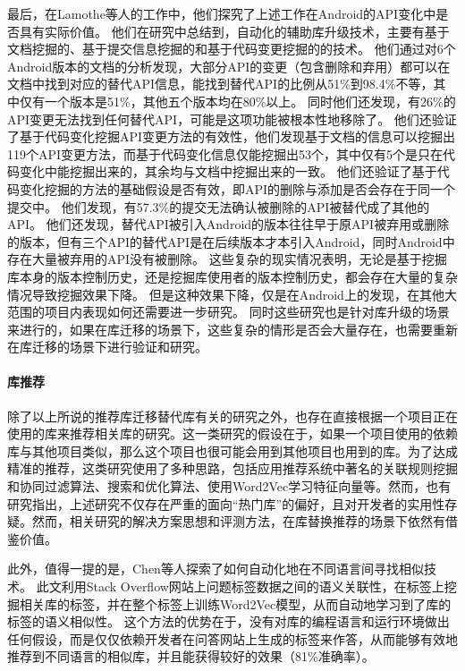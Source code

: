 \documentclass[UTF8]{ctexart}
\begin{document}
最后，在Lamothe等人\cite{2018MSR-Lamothe-Exploring}的工作中，他们探究了上述工作在Android的API变化中是否具有实际价值。
他们在研究中总结到，自动化的辅助库升级技术，主要有基于文档挖掘的、基于提交信息挖掘的和基于代码变更挖掘的的技术。
他们通过对6个Android版本的文档的分析发现，大部分API的变更（包含删除和弃用）都可以在文档中找到对应的替代API信息，能找到替代API的比例从51\%到98.4\%不等，其中仅有一个版本是51\%，其他五个版本均在80\%以上。
同时他们还发现，有26\%的API变更无法找到任何替代API，可能是这项功能被根本性地移除了。
他们还验证了基于代码变化挖掘API变更方法的有效性，他们发现基于文档的信息可以挖掘出119个API变更方法，而基于代码变化信息仅能挖掘出53个，其中仅有5个是只在代码变化中能挖掘出来的，其余均与文档中挖掘出来的一致。
他们还验证了基于代码变化挖掘的方法的基础假设是否有效，即API的删除与添加是否会存在于同一个提交中。
他们发现，有57.3\%的提交无法确认被删除的API被替代成了其他的API。
他们还发现，替代API被引入Android的版本往往早于原API被弃用或删除的版本，但有三个API的替代API是在后续版本才本引入Android，同时Android中存在大量被弃用的API没有被删除。
这些复杂的现实情况表明，无论是基于挖掘库本身的版本控制历史，还是挖掘库使用者的版本控制历史，都会存在大量的复杂情况导致挖掘效果下降。
但是这种效果下降，仅是在Android上的发现，在其他大范围的项目内表现如何还需要进一步研究。
同时这些研究也是针对库升级的场景来进行的，如果在库迁移的场景下，这些复杂的情形是否会大量存在，也需要重新在库迁移的场景下进行验证和研究。

\paragraph{库推荐}
除了以上所说的推荐库迁移替代库有关的研究之外，也存在直接根据一个项目正在使用的库来推荐相关库的研究\cite{2013WCRE-Thung-Automated, 2017InfoSciAndTech-Ouni-Search,2019MSR-Theeten-Import2Vec}。这一类研究的假设在于，如果一个项目使用的依赖库与其他项目类似，那么这个项目也很可能会用到其他项目也用到的库。为了达成精准的推荐，这类研究使用了多种思路，包括应用推荐系统中著名的关联规则挖掘和协同过滤算法\cite{2013WCRE-Thung-Automated}、搜索和优化算法\cite{2017InfoSciAndTech-Ouni-Search}、使用Word2Vec学习特征向量\cite{2019MSR-Theeten-Import2Vec}等。然而，也有研究指出，上述研究不仅存在严重的面向“热门库”的偏好，且对开发者的实用性存疑\cite{2020TSE-He-Diversified}。然而，相关研究的解决方案思想和评测方法，在库替换推荐的场景下依然有借鉴价值。

此外，值得一提的是，Chen等人探索了如何自动化地在不同语言间寻找相似技术\cite{2016ASE-SimilarTech}。
此文利用Stack Overflow网站上问题标签数据之间的语义关联性，在标签上挖掘相关库的标签，并在整个标签上训练Word2Vec模型，从而自动地学习到了库的标签的语义相似性。
这个方法的优势在于，没有对库的编程语言和运行环境做出任何假设，而是仅仅依赖开发者在问答网站上生成的标签来作答，从而能够有效地推荐到不同语言的相似库，并且能获得较好的效果（81\%准确率）。
\end{document}
